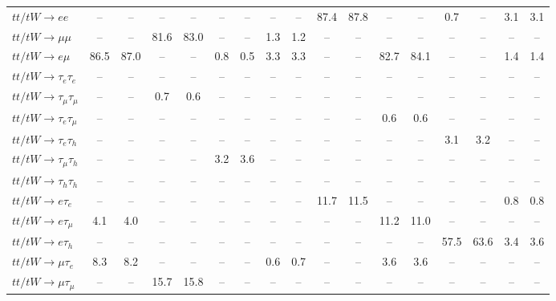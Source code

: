 \begin{sidewaystable}[ht]
{\begin{tabular}{|l|cc|cc|cc|cc|cc|cc|cc|cc|}
    $tt/tW \to ee$                     &   -- &   -- &   -- &   -- &   -- &   -- &   -- &   -- & 87.4 & 87.8 &   -- &   -- &  0.7 &   -- &  3.1 &  3.1 \\ 
    $tt/tW \to \mu\mu$                 &   -- &   -- & 81.6 & 83.0 &   -- &   -- &  1.3 &  1.2 &   -- &   -- &   -- &   -- &   -- &   -- &   -- &   -- \\ 
    $tt/tW \to e\mu$                   & 86.5 & 87.0 &   -- &   -- &  0.8 &  0.5 &  3.3 &  3.3 &   -- &   -- & 82.7 & 84.1 &   -- &   -- &  1.4 &  1.4 \\ 
    $tt/tW \to \tau_{e}\tau_{e}$       &   -- &   -- &   -- &   -- &   -- &   -- &   -- &   -- &   -- &   -- &   -- &   -- &   -- &   -- &   -- &   -- \\ 
    $tt/tW \to \tau_{\mu}\tau_{\mu}$   &   -- &   -- &  0.7 &  0.6 &   -- &   -- &   -- &   -- &   -- &   -- &   -- &   -- &   -- &   -- &   -- &   -- \\ 
    $tt/tW \to \tau_{e}\tau_{\mu}$     &   -- &   -- &   -- &   -- &   -- &   -- &   -- &   -- &   -- &   -- &  0.6 &  0.6 &   -- &   -- &   -- &   -- \\ 
    $tt/tW \to \tau_{e}\tau_{h}$       &   -- &   -- &   -- &   -- &   -- &   -- &   -- &   -- &   -- &   -- &   -- &   -- &  3.1 &  3.2 &   -- &   -- \\ 
    $tt/tW \to \tau_{\mu}\tau_{h}$     &   -- &   -- &   -- &   -- &  3.2 &  3.6 &   -- &   -- &   -- &   -- &   -- &   -- &   -- &   -- &   -- &   -- \\ 
    $tt/tW \to \tau_{h}\tau_{h}$       &   -- &   -- &   -- &   -- &   -- &   -- &   -- &   -- &   -- &   -- &   -- &   -- &   -- &   -- &   -- &   -- \\ 
    $tt/tW \to e\tau_{e}$              &   -- &   -- &   -- &   -- &   -- &   -- &   -- &   -- & 11.7 & 11.5 &   -- &   -- &   -- &   -- &  0.8 &  0.8 \\ 
    $tt/tW \to e\tau_{\mu}$            &  4.1 &  4.0 &   -- &   -- &   -- &   -- &   -- &   -- &   -- &   -- & 11.2 & 11.0 &   -- &   -- &   -- &   -- \\ 
    $tt/tW \to e\tau_{h}$              &   -- &   -- &   -- &   -- &   -- &   -- &   -- &   -- &   -- &   -- &   -- &   -- & 57.5 & 63.6 &  3.4 &  3.6 \\ 
    $tt/tW \to \mu\tau_{e}$            &  8.3 &  8.2 &   -- &   -- &   -- &   -- &  0.6 &  0.7 &   -- &   -- &  3.6 &  3.6 &   -- &   -- &   -- &   -- \\ 
    $tt/tW \to \mu\tau_{\mu}$          &   -- &   -- & 15.7 & 15.8 &   -- &   -- &   -- &   -- &   -- &   -- &   -- &   -- &   -- &   -- &   -- &   -- \\ 

\end{tabular}}
\end{sidewaystable}
